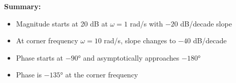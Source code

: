 \documentclass[11pt,a4paper]{article}
\begin{document}
\textbf{Summary:}
\begin{itemize}
  \item Magnitude starts at 20 dB at $\omega = 1$ rad/s with $-20$ dB/decade slope
  \item At corner frequency $\omega = 10$ rad/s, slope changes to $-40$ dB/decade
  \item Phase starts at $-90°$ and asymptotically approaches $-180°$
  \item Phase is $-135°$ at the corner frequency
\end{itemize}
\end{document}

